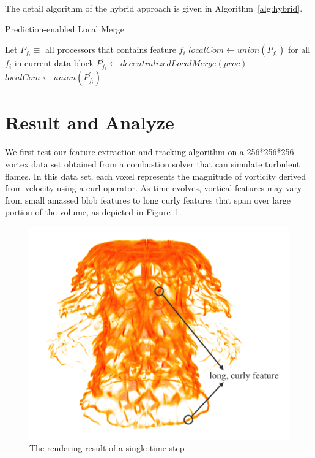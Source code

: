 \documentclass[10pt, conference, compsocconf]{IEEEtran}
\begin{document}
The detail algorithm of the hybrid approach is given in Algorithm~\ref{alg:hybrid}.
\begin{algorithm}
\caption{Prediction-enabled Local Merge}
\label{alg:hybrid}
	\begin{algorithmic}
		\STATE Let $P_{f_i} \equiv$ all processors that contains feature $f_i$
			\STATE $localCom \leftarrow union(P_{f_i})$ for all $f_i$ in current data block
		\ELSE
				\STATE $P_{f_i}^{'} \leftarrow decentralizedLocalMerge(proc)$
			\ENDFOR
			\STATE $localCom \leftarrow union(P_{f_i}^{'})$
		\ENDIF
	\end{algorithmic}
\end{algorithm}

\section{Result and Analyze}
We first test our feature extraction and tracking algorithm on a 256*256*256 vortex data set obtained from a combustion solver that can simulate turbulent flames. In this data set, each voxel represents the magnitude of vorticity derived from velocity using a curl operator. As time evolves, vortical features may vary from small amassed blob features to long curly features that span over large portion of the volume, as depicted in Figure~\ref{fig:combustion-labeled}.

\begin{figure}[!htp]
\includegraphics[width=0.9\linewidth]{combustion_labeled.png}
\caption{The rendering result of a single time step }
\label{fig:combustion-labeled}
\end{figure}
\end{document}
